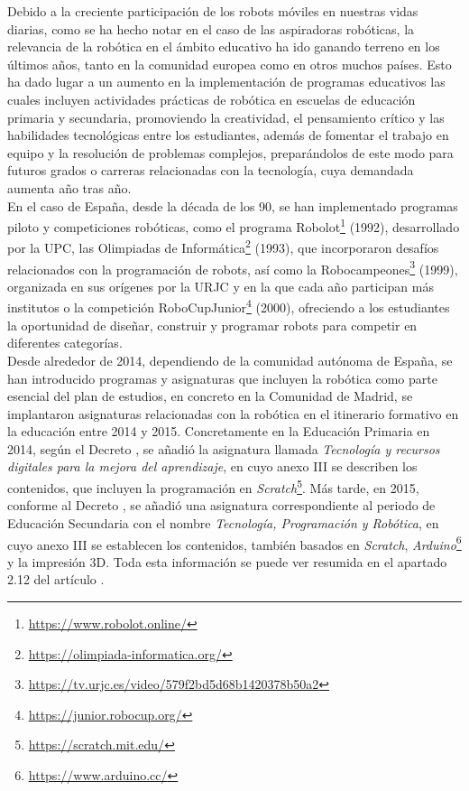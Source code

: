 Debido a la creciente participación de los robots móviles en nuestras vidas
diarias, como se ha hecho notar en el caso de las aspiradoras robóticas, la
relevancia de la robótica en el ámbito educativo ha ido ganando terreno en los
últimos años, tanto en la comunidad europea como en otros muchos países.
Esto ha dado lugar a un aumento en la implementación de programas educativos las
cuales incluyen actividades prácticas de robótica en escuelas de educación
primaria y secundaria, promoviendo la creatividad, el pensamiento crítico y las
habilidades tecnológicas entre los estudiantes, además de fomentar el trabajo en
equipo y la resolución de problemas complejos, preparándolos de este modo para
futuros grados o carreras relacionadas con la tecnología, cuya demandada aumenta
año tras año.
\\

En el caso de España, desde la década de los 90, se han implementado programas
piloto y competiciones robóticas, como el programa Robolot\footnote{
\url{https://www.robolot.online/}} (1992), desarrollado por la UPC, las
Olimpiadas de Informática\footnote{\url{https://olimpiada-informatica.org/}}
(1993), que incorporaron desafíos relacionados con la programación de robots,
así como la Robocampeones\footnote{
\url{https://tv.urjc.es/video/579f2bd5d68b1420378b50a2}} (1999), organizada en
sus orígenes por la URJC y en la que cada año participan más institutos o la
competición RoboCupJunior\footnote{\url{https://junior.robocup.org/}} (2000),
ofreciendo a los estudiantes la oportunidad de diseñar, construir y programar
robots para competir en diferentes categorías.
\\

Desde alrededor de 2014, dependiendo de la comunidad autónoma de España, se han
introducido programas y asignaturas que incluyen la robótica como parte esencial
del plan de estudios, en concreto en la Comunidad de Madrid, se implantaron
asignaturas relacionadas con la robótica en el itinerario formativo en la
educación entre 2014 y 2015.
Concretamente en la Educación Primaria en 2014, según el Decreto
\cite{Decreto2014}, se añadió la asignatura llamada \textit{Tecnología y
recursos digitales para la mejora del aprendizaje}, en cuyo anexo III se
describen los contenidos, que incluyen la programación en
\textit{Scratch}\footnote{\url{https://scratch.mit.edu/}}.
Más tarde, en 2015, conforme al Decreto \cite{Decreto2015}, se añadió una
asignatura correspondiente al periodo de Educación Secundaria con el nombre
\textit{Tecnología, Programación y Robótica}, en cuyo anexo III se establecen
los contenidos, también basados en \textit{Scratch},
\textit{Arduino}\footnote{\url{https://www.arduino.cc/}} y la impresión 3D.
Toda esta información se puede ver resumida en el apartado 2.12 del artículo
\cite{EducacionRob}.
\\

